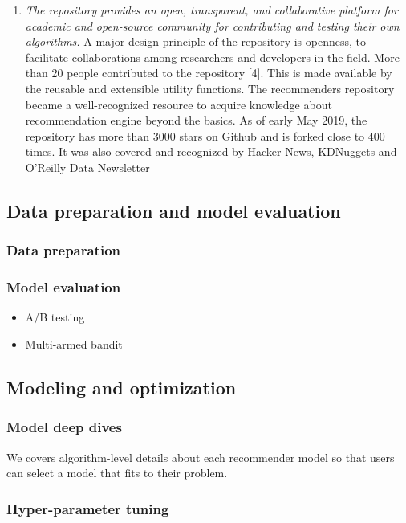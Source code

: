 \documentclass[twoside,11pt]{article}
\begin{document}
\begin{enumerate}
\item \emph{The repository provides an open, transparent, and collaborative platform for academic and open-source community for contributing and testing their own algorithms.} A major design principle of the repository is openness, to facilitate collaborations among researchers and developers in the field. More than 20 people contributed to the repository [4]. This is made available by the reusable and extensible utility functions. The recommenders repository became a well-recognized resource to acquire knowledge about recommendation engine beyond the basics. As of early May 2019, the repository has more than 3000 stars on Github and is forked close to 400 times. It was also covered and recognized by Hacker News, KDNuggets and O’Reilly Data Newsletter
\end{enumerate}


\subsection{Data preparation and model evaluation}
\subsubsection{Data preparation}
\subsubsection{Model evaluation}
\begin{itemize}
  \item A/B testing
  \item Multi-armed bandit
\end{itemize}

\subsection{Modeling and optimization}
\subsubsection{Model deep dives}
We covers algorithm-level details about each recommender model so that users can select a model that fits to their problem.
\subsubsection{Hyper-parameter tuning}
\end{document}
